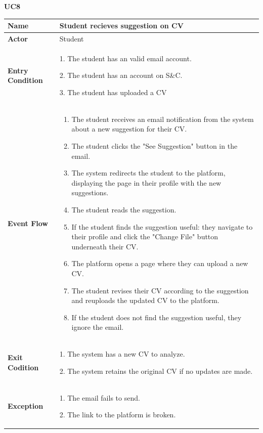 \pagebreak
\textbf{UC8}

\begin{longtable}{|p{}|p{}|}
\hline
\textbf{Name} &  Student recieves suggestion on CV\\
\hline
\textbf{Actor} &  Student\\
\hline
\textbf{Entry Condition} &  
1. The student has an valid email account.

2. The student has an account on S\&C. 

3. The student has uploaded a CV\\
\hline
\textbf{Event Flow} &  
\begin{enumerate}
    \item The student receives an email notification from the system about a new suggestion for their CV.
    \item The student clicks the "See Suggestion" button in the email.
    \item  The system redirects the student to the platform, displaying the page in their profile with the new suggestions.
    \item The student reads the suggestion.
    \item If the student finds the suggestion useful: they navigate to their profile and click the "Change File" button underneath their CV.
    \item The platform opens a page where they can upload a new CV.
    \item The student revises their CV according to the suggestion and reuploads the updated CV to the platform.
    \item If the student does not find the suggestion useful, they ignore the email.
\end{enumerate}\\
\hline
\textbf{Exit Codition} &  
1. The system has a new CV to analyze.

2. The system retains the original CV if no updates are made.\\
\hline
\textbf{Exception} &  
1. The email fails to send.

2. The link to the platform is broken.\\
\hline
\end{longtable}

